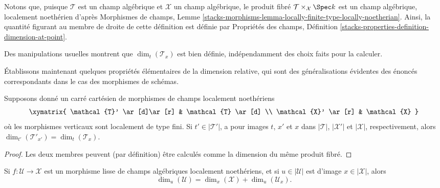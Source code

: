 \noindent
Notons que, puisque $\mathcal{T}$ est un champ algébrique et $\mathcal{X}$ un
champ algébrique, le produit fibré $\mathcal{T}\times_{\mathcal{X}} \Spec k$
est un champ algébrique, localement noethérien d'après
Morphismes de champs, Lemme
\ref{stacks-morphisms-lemma-locally-finite-type-locally-noetherian}.
Ainsi, la quantité figurant au membre de droite de cette définition
est définie par Propriétés des champs,
Définition \ref{stacks-properties-definition-dimension-at-point}.

\begin{remark}
\label{remark-dimension-tangent-space-well-defined}
Des manipulations usuelles montrent que $\dim_t(\mathcal{T}_x)$ est bien définie,
indépendamment des choix faits pour la calculer.
\end{remark}

\noindent
Établissons maintenant quelques propriétés élémentaires de la dimension relative,
qui sont des généralisations évidentes des énoncés correspondants dans le
cas des morphismes de schémas.

\begin{lemma}
\label{lemma-base-change-invariance-of-relative-dimension}
Supposons donné
un carré cartésien de morphismes de champs localement noethériens
$$
\xymatrix{
\mathcal{T}' \ar[d]\ar[r] & \mathcal{T} \ar[d] \\
\mathcal{X}' \ar[r] & \mathcal{X}
}
$$
où les morphismes verticaux sont localement de type fini.
Si $t' \in |\mathcal{T}'|$,
a pour images $t$, $x'$ et $x$ dans $|\mathcal{T}|$, $|\mathcal{X}'|$ et
$|\mathcal{X}|$,
respectivement, alors $\dim_{t'}(\mathcal{T}'_{x'}) = \dim_{t}(\mathcal{T}_x).$
\end{lemma}

\begin{proof}
Les deux membres peuvent (par définition) être calculés comme la
dimension du même produit fibré.
\end{proof}

\begin{lemma}
\label{lemma-behaviour-of-dimensions-wrt-smooth-morphisms-stacky}
Si $f: \mathcal{U} \to \mathcal{X}$ est un morphisme lisse de champs algébriques
localement noethériens, et
si $u \in |\mathcal{U}|$ est d'image $x \in |\mathcal{X}|$,
alors
$$
\dim_u (\mathcal{U}) = \dim_x(\mathcal{X}) + \dim_{u} (\mathcal{U}_x).
$$
\end{lemma}

